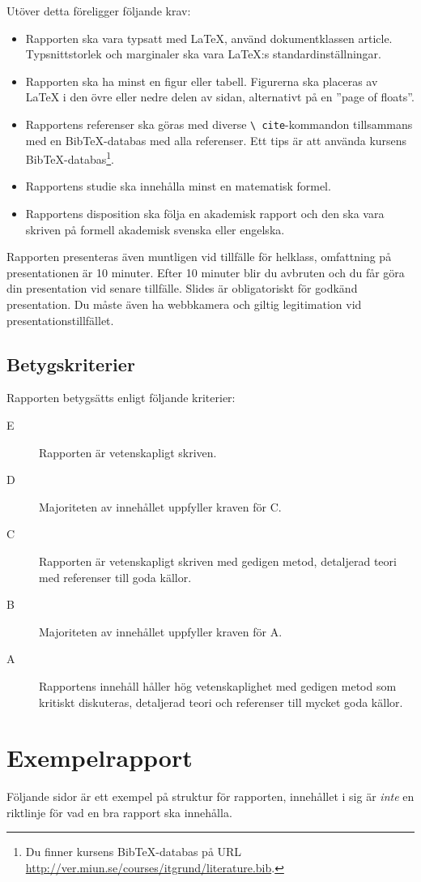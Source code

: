 \documentclass[a4paper,nocourse]{miunasgn}
\begin{document}
Utöver detta föreligger följande krav:
\begin{itemize}
  \item Rapporten ska vara typsatt med LaTeX, använd dokumentklassen article.
    Typsnittstorlek och marginaler ska vara LaTeX:s standardinställningar.
  \item Rapporten ska ha minst en figur eller tabell.
    Figurerna ska placeras av LaTeX i den övre eller nedre delen av sidan, 
    alternativt på en ''page of floats''.
  \item Rapportens referenser ska göras med diverse \texttt{\textbackslash 
    cite}-kommandon tillsammans med en BibTeX-databas med alla referenser.
    Ett tips är att använda kursens BibTeX-databas\footnote{%
      Du finner kursens BibTeX-databas på URL 
      \url{http://ver.miun.se/courses/itgrund/literature.bib}.
    }.
  \item Rapportens studie ska innehålla minst en matematisk formel.
  \item Rapportens disposition ska följa en akademisk rapport och den ska vara 
    skriven på formell akademisk svenska eller engelska.
\end{itemize}

Rapporten presenteras även muntligen vid tillfälle för helklass, omfattning på 
presentationen är 10 minuter.
Efter 10 minuter blir du avbruten och du får göra din presentation vid senare 
tillfälle.
Slides är obligatoriskt för godkänd presentation.
Du måste även ha webbkamera och giltig legitimation vid 
presentationstillfället.

\subsection{Betygskriterier}

Rapporten betygsätts enligt följande kriterier:
\begin{description}
  \item[E] Rapporten är vetenskapligt skriven.
  \item[D] Majoriteten av innehållet uppfyller kraven för C.
  \item[C] Rapporten är vetenskapligt skriven med gedigen metod, detaljerad 
    teori med referenser till goda källor.
  \item[B] Majoriteten av innehållet uppfyller kraven för A.
  \item[A] Rapportens innehåll håller hög vetenskaplighet med gedigen metod som 
    kritiskt diskuteras, detaljerad teori och referenser till mycket goda 
    källor.
\end{description}


\printbibliography


\appendix
\section{Exempelrapport}

Följande sidor är ett exempel på struktur för rapporten, innehållet i sig är 
\emph{inte} en riktlinje för vad en bra rapport ska innehålla.


\end{document}
